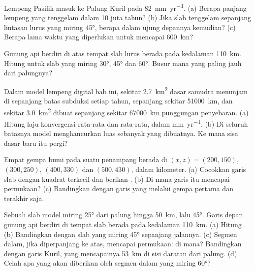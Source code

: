 \begin{exercise}[$\star$]\label{exo:b1:active-margins:2}
Lempeng Pasifik masuk ke Palung Kuril pada \qty{82}{mm.yr^{-1}}. (a) Berapa panjang lempeng yang tenggelam dalam 10 juta tahun? (b) Jika slab tenggelam sepanjang lintasan lurus yang miring \ang{45}, berapa dalam ujung depannya kemudian? (c) Berapa lama waktu yang diperlukan untuk mencapai \qty{600}{km}?
\end{exercise}

\begin{exercise}[$\star$]\label{exo:b1:active-margins:3}
Gunung api berdiri di atas tempat slab lurus berada pada kedalaman \qty{110}{km}. Hitung  untuk slab yang miring \ang{30}, \ang{45} dan \ang{60}. Busur mana yang paling jauh dari palungnya?
\end{exercise}

\begin{exercise}[$\star$]\label{exo:b1:active-margins:4}
Dalam model lempeng digital bab ini, sekitar \qty{2.7}{km^2} dasar samudra menunjam di sepanjang batas subduksi setiap tahun, sepanjang sekitar \qty{51000}{km}, dan sekitar \qty{3.0}{km^2} dibuat sepanjang sekitar \qty{67000}{km} punggungan penyebaran. (a) Hitung laju konvergensi rata-rata dan  rata-rata, dalam \unit{mm.yr^{-1}}. (b) Di seluruh batasnya model menghancurkan luas sebanyak yang dibuatnya. Ke mana sisa dasar baru itu pergi?
\end{exercise}

\begin{exercise}[$\star\star$]\label{exo:b1:active-margins:5}
Empat gempa bumi pada suatu penampang berada di $(x, z) = (200, 150)$, $(300, 250)$, $(400, 330)$ dan $(500, 430)$, dalam kilometer. (a) Cocokkan garis slab dengan kuadrat terkecil dan berikan . (b) Di mana garis itu mencapai permukaan? (c) Bandingkan dengan  garis yang melalui gempa pertama dan terakhir saja.
\end{exercise}

\begin{exercise}[$\star\star$]\label{exo:b1:active-margins:6}
Sebuah slab model miring \ang{25} dari palung hingga \qty{50}{km}, lalu \ang{45}. Garis depan gunung api berdiri di tempat slab berada pada kedalaman \qty{110}{km}. (a) Hitung . (b) Bandingkan dengan slab yang miring \ang{45} sepanjang jalannya. (c) Segmen dalam, jika diperpanjang ke atas, mencapai permukaan: di mana? Bandingkan dengan garis Kuril, yang mencapainya \qty{53}{km} di sisi daratan dari palung. (d) Celah apa yang akan diberikan oleh segmen dalam yang miring \ang{60}?
\end{exercise}

